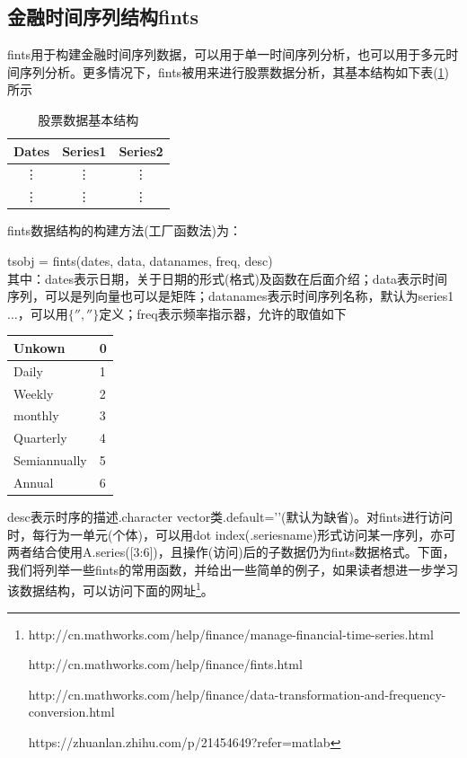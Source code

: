     \subsection{金融时间序列结构fints}
        \par
        fints用于构建金融时间序列数据，可以用于单一时间序列分析，也可以用于多元时间序列分析。更多情况下，fints被用来进行股票数据分析，其基本结构如下表(\ref{tab:股票数据基本结构})所示
        \begin{table}[H]
        \centering
        \caption{股票数据基本结构}
        \label{tab:股票数据基本结构}
          \begin{tabular}{c|c|c}
            \hline
            Dates & Series1 & Series2\\
            \hline
            \vdots &\vdots & \vdots \\
            \vdots &\vdots & \vdots \\
        \end{tabular}
        \end{table}
        fints数据结构的构建方法(工厂函数法)为：
        \par
        tsobj = fints(dates, data, datanames, freq, desc)\\
        其中：dates表示日期，关于日期的形式(格式)及函数在后面介绍；data表示时间序列，可以是列向量也可以是矩阵；datanames表示时间序列名称，默认为series1$\dots$，可以用$\{'', ''\}$定义；freq表示频率指示器，允许的取值如下
        \begin{table}[H]
        \centering
        \label{tab:freq允许的取值有}
          \begin{tabular}{l|l}
            \hline
            Unkown & 0\\
            \hline
            Daily &1\\
            \hline
            Weekly & 2\\
            \hline
            monthly &3\\
            \hline
            Quarterly &4\\
            \hline
            Semiannually & 5\\
            \hline
            Annual & 6\\
            \hline
        \end{tabular}
        \end{table}
        \par
        desc表示时序的描述.character vector类.default=’’(默认为缺省)。对fints进行访问时，每行为一单元(个体)，可以用dot index(.seriesname)形式访问某一序列，亦可两者结合使用A.series([3:6])，且操作(访问)后的子数据仍为fints数据格式。下面，我们将列举一些fints的常用函数，并给出一些简单的例子，如果读者想进一步学习该数据结构，可以访问下面的网址\footnote{http://cn.mathworks.com/help/finance/manage-financial-time-series.html\par
        http://cn.mathworks.com/help/finance/fints.html\par
        http://cn.mathworks.com/help/finance/data-transformation-and-frequency-conversion.html\par
        https://zhuanlan.zhihu.com/p/21454649?refer=matlab
        }。
